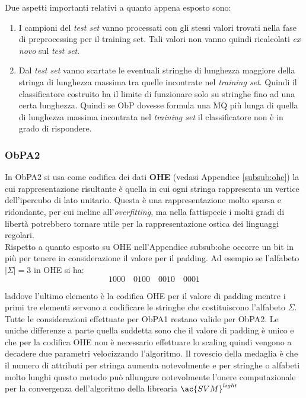 Due aspetti importanti relativi a quanto appena esposto sono:
\begin{enumerate}
\item I campioni del \textit{test set} vanno processati con gli stessi valori trovati nella fase di preprocessing per il training set. Tali valori non vanno quindi ricalcolati \textit{ex novo} sul \textit{test set}.
\item Dal \textit{test set} vanno scartate le eventuali stringhe di lunghezza maggiore della stringa di lunghezza massima tra quelle incontrate nel \textit{training set}. Quindi il classificatore costruito ha il limite di funzionare solo su stringhe fino ad una certa lunghezza. Quindi se \ac{ObP} dovesse formula una \ac{MQ} più lunga di quella di lunghezza massima incontrata nel \textit{training set} il classificatore non è in grado di rispondere. 
\end {enumerate}

\subsubsection{ObPA2}
In \ac{ObPA}2 si usa come codifica dei dati \textbf{OHE} (vedasi Appendice \ref{subsub:ohe}) la cui rappresentazione risultante è quella in cui ogni stringa rappresenta un vertice dell'ipercubo di lato unitario. Questa è una rappresentazione molto sparsa e ridondante, per cui incline all'\textit{overfitting}, ma nella fattispecie i molti gradi di libertà potrebbero tornare utile per la rappresentazione ostica dei linguaggi regolari.\\
Rispetto a quanto esposto su OHE nell'Appendice {subsub:ohe} occorre un bit in più per tenere in considerazione il valore per il padding. Ad esempio se l'alfabeto $|\Sigma|=3$ in OHE si ha:
\begin{equation*}
1000 \quad 0100 \quad 0010 \quad 0001
\end{equation*} 

laddove l'ultimo elemento è la codifica OHE per il valore di padding mentre i primi tre elementi servono a codificare le stringhe che costituiscono l'alfabeto $\Sigma$.\\
Tutte le considerazioni effettuate per \ac{ObPA}1 restano valide per \ac{ObPA}2. Le uniche differenze a parte quella suddetta sono che il valore di padding è unico e che per la codifica OHE non è necessario effettuare lo scaling quindi vengono a decadere due parametri velocizzando l'algoritmo. Il rovescio della medaglia è che il numero di attributi per stringa aumenta notevolmente e per stringhe o alfabeti molto lunghi questo metodo può allungare notevolmente l'onere computazionale per la convergenza dell'algoritmo  della librearia $\ac{SVM}^{light}$  

